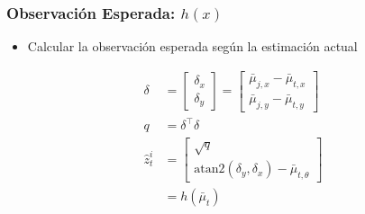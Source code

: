 \begin{frame}
    \frametitle{Observación Esperada: $h(x)$}

    \begin{itemize}
        \item Calcular la observación esperada según la estimación actual
    \end{itemize}

    \begin{align*}
        \delta &= \begin{bmatrix}
        \delta_x \\
        \delta_y
        \end{bmatrix} = \begin{bmatrix}
        \bar{\mu}_{j,x} - \bar{\mu}_{t,x} \\
        \bar{\mu}_{j,y} - \bar{\mu}_{t,y}
        \end{bmatrix}\\
        q &= \delta^{\top} \delta\\
        \hat{z}_t^i &= \begin{bmatrix}
        \sqrt{q} \\
        \text{atan2}(\delta_y, \delta_x) - \bar{\mu}_{t,\theta}
        \end{bmatrix}\\
        &= h(\bar{\mu}_t)
    \end{align*}
\end{frame}

